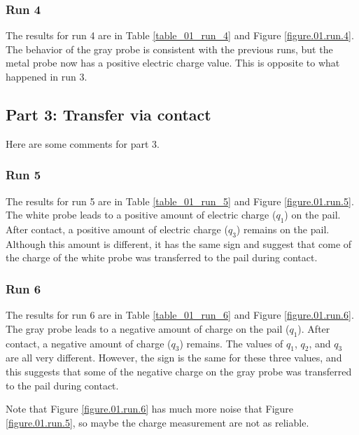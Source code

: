 \subsubsection{Run 4}
The results for run 4 are in Table \ref{table_01_run_4} and Figure \ref{figure.01.run.4}. The behavior of the gray probe is consistent with the previous runs, but the metal probe now has a positive electric charge value. This is opposite to what happened in run 3.
\subsection{Part 3: Transfer via contact}
Here are some comments for part 3.
\subsubsection{Run 5}
The results for run 5 are in Table \ref{table_01_run_5} and Figure \ref{figure.01.run.5}. The white probe leads to a positive amount of electric charge ($q_{1}$) on the pail. After contact, a positive amount of electric charge ($q_{3}$) remains on the pail. Although this amount is different, it has the same sign and suggest that come of the charge of the white probe was transferred to the pail during contact.
\subsubsection{Run 6}
The results for run 6 are in Table \ref{table_01_run_6} and Figure \ref{figure.01.run.6}. The gray probe leads to a negative amount of charge on the pail ($q_{1}$). After contact, a negative amount of charge ($q_{3}$) remains. The values of $q_{1}$, $q_{2}$, and $q_{3}$ are all very different. However, the sign is the same for these three values, and this suggests that some of the negative charge on the gray probe was transferred to the pail during contact.

Note that Figure \ref{figure.01.run.6} has much more noise that Figure \ref{figure.01.run.5}, so maybe the charge measurement are not as reliable.
